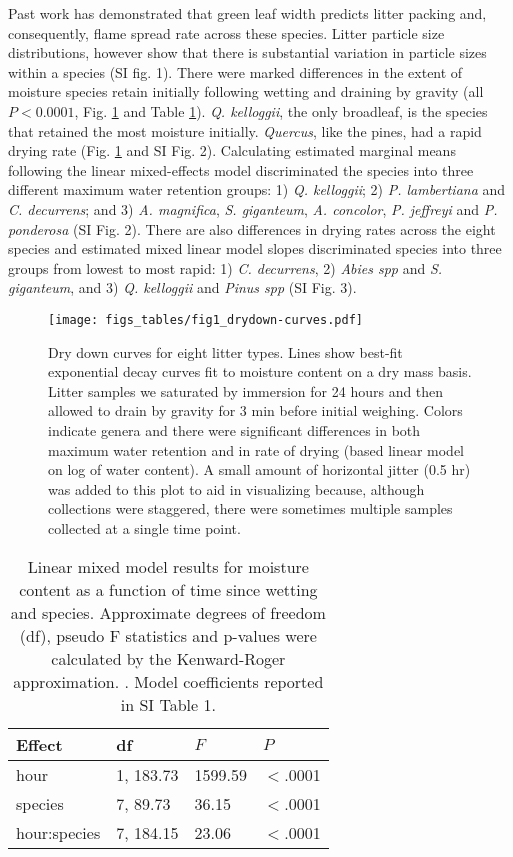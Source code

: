 \documentclass[letterpaper,12pt]{article}
\begin{document}
Past work has demonstrated that green leaf width predicts litter packing and,
consequently, flame spread rate across these species. Litter particle size
distributions, however show that there is substantial variation in particle
sizes within a species (SI fig. 1). There were marked differences in the extent
of moisture species retain initially following wetting and draining by gravity
(all $P < 0.0001$, Fig. \ref{fig:drydown} and Table \ref{tab:drydown}).
\emph{Q. kelloggii}, the only broadleaf, is the species that retained the most
moisture initially. \emph{Quercus}, like the pines, had a rapid drying rate
(Fig. \ref{fig:drydown} and SI Fig. 2). Calculating estimated marginal means
following the linear mixed-effects model discriminated the species into three
different maximum water retention groups: 1) \emph{Q. kelloggii}; 2) \emph{P.
  lambertiana} and \emph{C. decurrens}; and 3) \emph{A. magnifica}, \emph{S.
  giganteum}, \emph{A. concolor}, \emph{P. jeffreyi} and \emph{P. ponderosa}
(SI Fig. 2). There are also differences in drying rates across the eight
species and estimated mixed linear model slopes discriminated species into
three groups from lowest to most rapid: 1) \emph{C. decurrens}, 2) \emph{Abies
  spp} and \emph{S. giganteum}, and 3) \emph{Q. kelloggii} and \emph{Pinus spp}
(SI Fig. 3).

\begin{figure}[h]
  \centering
\texttt{[image: figs\_tables/fig1\_drydown-curves.pdf]}
\caption{Dry down curves for eight litter types. Lines show best-fit
  exponential decay curves fit to moisture content on a dry mass basis. Litter
  samples we saturated by immersion for 24 hours and then allowed to drain by
  gravity for 3 min before initial weighing. Colors indicate genera and there
  were significant differences in both maximum water retention and in rate of
  drying (based linear model on log of water content). A small amount of
  horizontal jitter (0.5 hr) was added to this plot to aid in visualizing
  because, although collections were staggered, there were sometimes multiple
  samples collected at a single time point.}
 \label{fig:drydown}
\end{figure}


\begin{table}[h]
  \caption{Linear mixed model results for moisture content as a function of
    time since wetting and species. Approximate degrees of freedom (df), pseudo F
    statistics and p-values were calculated by the Kenward-Roger approximation.
    \citep{Kenward_Roger-1997}. Model coefficients reported in SI Table 1.}
  \label{tab:drydown}
\centering
\begin{tabular}{llll}
  \toprule
Effect & df & $F$ & $P$ \\ 
  \midrule
  hour & 1, 183.73 & 1599.59 & $<$.0001 \\ 
  species & 7, 89.73 & 36.15 & $<$.0001 \\ 
  hour:species & 7, 184.15 & 23.06 & $<$.0001 \\ 
   \bottomrule
\end{tabular}
\end{table}
\end{document}
